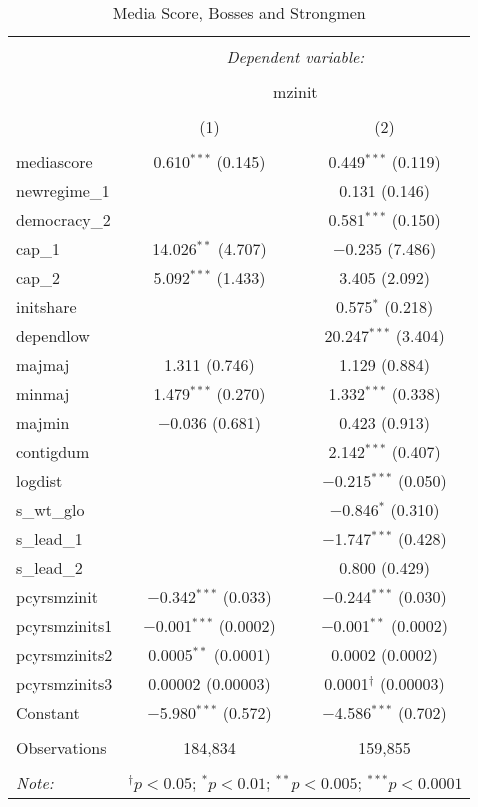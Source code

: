 
\begin{table}[!htbp] \centering 
  \caption{Media Score, Bosses and Strongmen} 
  \label{} 
\begin{tabular}{@{\extracolsep{5pt}}lcc} 
\\[-1.8ex]\hline 
\hline \\[-1.8ex] 
 & \multicolumn{2}{c}{\textit{Dependent variable:}} \\ 
\cline{2-3} 
\\[-1.8ex] & \multicolumn{2}{c}{mzinit} \\ 
\\[-1.8ex] & (1) & (2)\\ 
\hline \\[-1.8ex] 
 mediascore & 0.610$^{***}$ (0.145) & 0.449$^{***}$ (0.119) \\ 
  newregime\_1 &  & 0.131 (0.146) \\ 
  democracy\_2 &  & 0.581$^{***}$ (0.150) \\ 
  cap\_1 & 14.026$^{**}$ (4.707) & $-$0.235 (7.486) \\ 
  cap\_2 & 5.092$^{***}$ (1.433) & 3.405 (2.092) \\ 
  initshare &  & 0.575$^{*}$ (0.218) \\ 
  dependlow &  & 20.247$^{***}$ (3.404) \\ 
  majmaj & 1.311 (0.746) & 1.129 (0.884) \\ 
  minmaj & 1.479$^{***}$ (0.270) & 1.332$^{***}$ (0.338) \\ 
  majmin & $-$0.036 (0.681) & 0.423 (0.913) \\ 
  contigdum &  & 2.142$^{***}$ (0.407) \\ 
  logdist &  & $-$0.215$^{***}$ (0.050) \\ 
  s\_wt\_glo &  & $-$0.846$^{*}$ (0.310) \\ 
  s\_lead\_1 &  & $-$1.747$^{***}$ (0.428) \\ 
  s\_lead\_2 &  & 0.800 (0.429) \\ 
  pcyrsmzinit & $-$0.342$^{***}$ (0.033) & $-$0.244$^{***}$ (0.030) \\ 
  pcyrsmzinits1 & $-$0.001$^{***}$ (0.0002) & $-$0.001$^{**}$ (0.0002) \\ 
  pcyrsmzinits2 & 0.0005$^{**}$ (0.0001) & 0.0002 (0.0002) \\ 
  pcyrsmzinits3 & 0.00002 (0.00003) & 0.0001$^{\dagger}$ (0.00003) \\ 
  Constant & $-$5.980$^{***}$ (0.572) & $-$4.586$^{***}$ (0.702) \\ 
 \hline \\[-1.8ex] 
Observations & 184,834 & 159,855 \\ 
\hline 
\hline \\[-1.8ex] 
\textit{Note:}  & \multicolumn{2}{r}{$^{\dagger} p<0.05$; $^{*} p<0.01$; $^{**} p<0.005$; $^{***} p<0.0001$} \\ 
\end{tabular} 
\end{table} 
